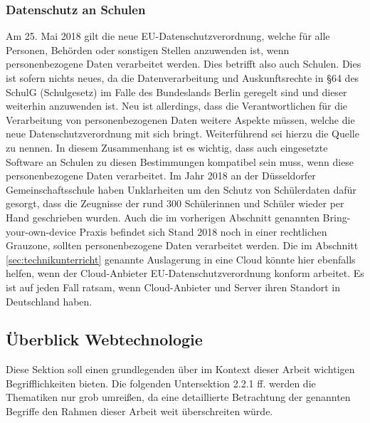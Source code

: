 \subsubsection{Datenschutz an Schulen}\label{sec:datenschutz}
Am 25. Mai 2018 gilt die neue EU-Datenschutzverordnung, welche für alle Personen, Behörden oder sonstigen Stellen anzuwenden ist, wenn personenbezogene Daten verarbeitet werden. Dies betrifft also auch Schulen. Dies ist sofern nichts neues, da die Datenverarbeitung und Auskunftsrechte in §64 des SchulG (Schulgesetz) im Falle des Bundeslands Berlin geregelt sind und dieser weiterhin anzuwenden ist. Neu ist allerdings, dass die Verantwortlichen für die Verarbeitung von personenbezogenen Daten weitere Aspekte müssen, welche die neue Datenschutzverordnung mit sich bringt. Weiterführend sei hierzu die Quelle \cite[Datenschutz in der Schule]{Kachelriess2019} zu nennen. In diesem Zusammenhang ist es wichtig, dass auch eingesetzte Software an Schulen zu diesen Bestimmungen kompatibel sein muss, wenn diese personenbezogene Daten verarbeitet. Im Jahr 2018 an der Düsseldorfer Gemeinschaftsschule haben Unklarheiten um den Schutz von Schülerdaten dafür gesorgt, dass die Zeugnisse der rund 300 Schülerinnen und Schüler wieder per Hand geschrieben wurden. Auch die im vorherigen Abschnitt genannten Bring-your-own-device Praxis befindet sich Stand 2018 noch in einer rechtlichen Grauzone, sollten personenbezogene Daten verarbeitet werden\cite{WitmerGossner2018}. Die im Abschnitt \ref{sec:technikunterricht} genannte Auslagerung in eine Cloud könnte hier ebenfalls helfen, wenn der Cloud-Anbieter EU-Datenschutzverordnung konform arbeitet. Es ist auf jeden Fall ratsam, wenn Cloud-Anbieter und Server ihren Standort in Deutschland haben.

\newpage

\subsection{Überblick Webtechnologie}\label{sec:webbasedsoftware}
Diese Sektion soll einen grundlegenden über im Kontext dieser Arbeit wichtigen Begrifflichkeiten bieten. Die folgenden Untersektion 2.2.1 ff. werden die Thematiken nur grob umreißen, da eine detaillierte Betrachtung der genannten Begriffe den Rahmen dieser Arbeit weit überschreiten würde. 

